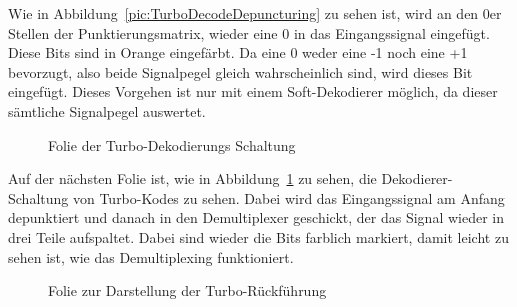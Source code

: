 Wie in Abbildung~\ref{pic:TurboDecodeDepuncturing} zu sehen ist, wird an den 0er Stellen der Punktierungsmatrix, wieder eine 0 in das Eingangssignal eingefügt. Diese Bits sind in Orange eingefärbt. Da eine 0 weder eine -1 noch eine +1 bevorzugt, also beide Signalpegel gleich wahrscheinlich sind, wird dieses Bit eingefügt. Dieses Vorgehen ist nur mit einem Soft-Dekodierer möglich, da dieser sämtliche Signalpegel auswertet. 

\begin{figure}[th]
\centering
{}
\caption{Folie der Turbo-Dekodierungs Schaltung}
\label{pic:TurboDecode}
\end{figure}

Auf der nächsten Folie ist, wie in Abbildung~\ref{pic:TurboDecode} zu sehen, die Dekodierer-Schaltung von Turbo-Kodes zu sehen. Dabei wird das Eingangssignal am Anfang depunktiert und danach in den Demultiplexer geschickt, der das Signal wieder in drei Teile aufspaltet. Dabei sind wieder die Bits farblich markiert, damit leicht zu sehen ist, wie das Demultiplexing funktioniert.

\begin{figure}[th]
\centering
{}
\caption{Folie zur Darstellung der Turbo-Rückführung}
\label{pic:TurboDecodeBack}
\end{figure}

